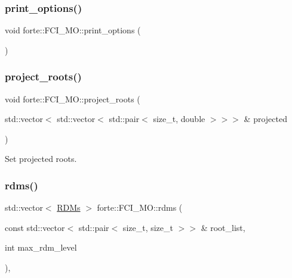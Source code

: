 \subsubsection{\texorpdfstring{print\+\_\+options()}{print\_options()}}
{\footnotesize\ttfamily void forte\+::\+F\+C\+I\+\_\+\+M\+O\+::print\+\_\+options (\begin{DoxyParamCaption}{ }\end{DoxyParamCaption})\hspace{0.3cm}{\ttfamily [protected]}}

\mbox{\label{classforte_1_1_f_c_i___m_o_acabb2c574095ac624b78acc826b6db1b}} 
\subsubsection{\texorpdfstring{project\+\_\+roots()}{project\_roots()}}
{\footnotesize\ttfamily void forte\+::\+F\+C\+I\+\_\+\+M\+O\+::project\+\_\+roots (\begin{DoxyParamCaption}\item[{std\+::vector$<$ std\+::vector$<$ std\+::pair$<$ size\+\_\+t, double $>$$>$$>$ \&}]{projected }\end{DoxyParamCaption})\hspace{0.3cm}{\ttfamily [inline]}}



Set projected roots. 

\mbox{\label{classforte_1_1_f_c_i___m_o_afe4bb6cb53fbf4190c020ee3fa794237}} 
\subsubsection{\texorpdfstring{rdms()}{rdms()}}
{\footnotesize\ttfamily std\+::vector$<$ \mbox{\hyperlink{classforte_1_1_r_d_ms}{R\+D\+Ms}} $>$ forte\+::\+F\+C\+I\+\_\+\+M\+O\+::rdms (\begin{DoxyParamCaption}\item[{const std\+::vector$<$ std\+::pair$<$ size\+\_\+t, size\+\_\+t $>$$>$ \&}]{root\+\_\+list,  }\item[{int}]{max\+\_\+rdm\+\_\+level }\end{DoxyParamCaption})\hspace{0.3cm}{\ttfamily [override]}, {\ttfamily [virtual]}}



